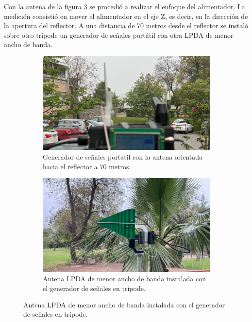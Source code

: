 Con la antena de la figura \ref{fig:antena_lpda} se procedió a realizar el enfoque del alimentador. La medición consistió en mover el alimentador en el eje Z, es decir, en la dirección de la apertura del reflector. A una distancia de 70 metros desde el reflector se instaló sobre otro trípode un generador de señales portátil con otra LPDA de menor ancho de banda.\\

\begin{figure}[h!]
    \centering
    \begin{subfigure}{0.45\textwidth}
        \includegraphics[width=\textwidth]{img/enfoque_cerca}
        \caption{Generador de señales portatil con la antena orientada hacia el reflector a 70 metros.}
        \label{fig:generador}
    \end{subfigure}
    \begin{subfigure}{0.45\textwidth}
        \includegraphics[width=\textwidth]{img/enfoque_cerca1}
        \caption{Antena LPDA de menor ancho de banda instalada con el generador de señales en tripode.}
        \label{fig:antena_lpda}
    \end{subfigure}
\end{figure}

